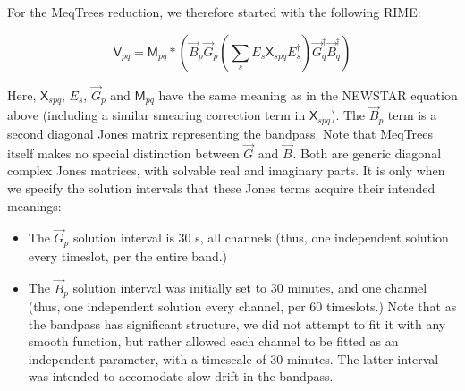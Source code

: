 \documentclass[]{aa}
\newcommand{\jones}[2]{\vec {#1}_{#2}}
\newcommand{\jonesT}[2]{\vec {#1}^\dagger_{#2}}
\newcommand{\coh}[2]{\mathsf{{#1}}_{{#2}}}
\begin{document}
For the MeqTrees reduction, we therefore started with the following RIME:

\begin{equation}\label{eq:3C147:bandpass}
\coh{V}{pq} = \coh{M}{pq} \ast \left ( \jones{B}{p} \jones{G}{p} \left( \sum_s E_s \coh{X}{spq} E^{\dagger}_s \right)  \jonesT{G}{q} \jonesT{B}{q} \right )
\end{equation}

Here, $\coh{X}{spq}$, $E_s$, $\jones{G}{p}$ and $\coh{M}{pq}$ have the same meaning as in the NEWSTAR equation above (including a similar smearing correction term in $\coh{X}{spq}$). The $\jones{B}{p}$ term is a second diagonal Jones matrix representing the bandpass. Note that MeqTrees itself makes no special distinction between $\jones{G}{}$ and $\jones{B}{}$. Both are generic diagonal complex Jones matrices, with solvable real and imaginary parts. It is only when we specify the solution intervals that these Jones terms acquire their intended meanings:

\begin{itemize}
\item The $\jones{G}{p}$ solution interval is 30 s, all channels (thus, one independent solution every timeslot, per the entire band.)
\item The $\jones{B}{p}$ solution interval was initially set to 30 minutes, and one channel (thus, one independent solution every channel, per 60 timeslots.) Note that as the bandpass has significant structure, we did not attempt to fit it with any smooth function, but rather allowed each channel to be fitted as an independent parameter, with a timescale of 30 minutes. The latter interval was intended to accomodate slow drift in the bandpass.
\end{itemize}
\end{document}
